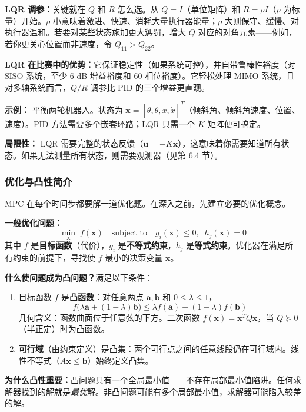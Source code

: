 \textbf{LQR 调参：}关键就在 $Q$ 和 $R$ 怎么选。从 $Q = I$（单位矩阵）和 $R = \rho I$（$\rho$ 为标量）开始。$\rho$ 小意味着激进、快速、消耗大量执行器能量；$\rho$ 大则保守、缓慢、对执行器温和。若要对某些状态施加更大惩罚，增大 $Q$ 对应的对角元素——例如，若你更关心位置而非速度，令 $Q_{11} > Q_{22}$。

\textbf{LQR 在比赛中的优势：}它保证稳定性（如果系统可控），并自带鲁棒性裕度（对 SISO 系统，至少 6 dB 增益裕度和 60\textdegree{} 相位裕度）。它轻松处理 MIMO 系统，且对多轴系统而言，$Q/R$ 调参比 PID 的三个增益更直观。

\textbf{示例：} 平衡两轮机器人。状态为 $\mathbf{x} = [\theta, \dot{\theta}, x, \dot{x}]^T$（倾斜角、倾斜角速度、位置、速度）。PID 方法需要多个嵌套环路；LQR 只需一个 $K$ 矩阵便可搞定。

\textbf{局限性：} LQR 需要完整的状态反馈（$\mathbf{u} = -K\mathbf{x}$），这意味着你需要知道所有状态。如果无法测量所有状态，则需要观测器（见第 6.4 节）。

\subsubsection{优化与凸性简介}

MPC 在每个时间步都要解一道优化题。在深入之前，先建立必要的优化概念。

\textbf{一般优化问题：}
\[
\min_{\mathbf{x}} \; f(\mathbf{x}) \quad \text{subject to} \quad g_i(\mathbf{x}) \leq 0, \;\; h_j(\mathbf{x}) = 0
\]
其中 $f$ 是\textbf{目标函数}（代价），$g_i$ 是\textbf{不等式约束}，$h_j$ 是\textbf{等式约束}。优化器在满足所有约束的前提下，寻找使 $f$ 最小的决策变量 $\mathbf{x}$。

\textbf{什么使问题成为凸问题？}满足以下条件：
\begin{enumerate}[nosep]
    \item 目标函数 $f$ 是\textbf{凸函数}：对任意两点 $\mathbf{a}, \mathbf{b}$ 和 $0 \leq \lambda \leq 1$，
    \[
    f\bigl(\lambda \mathbf{a} + (1-\lambda)\mathbf{b}\bigr) \leq \lambda f(\mathbf{a}) + (1-\lambda) f(\mathbf{b})
    \]
    几何含义：函数曲面位于任意弦的下方。二次函数 $f(\mathbf{x}) = \mathbf{x}^T Q \mathbf{x}$，当 $Q \succeq 0$（半正定）时为凸函数。
    \item \textbf{可行域}（由约束定义）是凸集：两个可行点之间的任意线段仍在可行域内。线性不等式（$A\mathbf{x} \leq \mathbf{b}$）始终定义凸集。
\end{enumerate}

\textbf{为什么凸性重要：}凸问题只有一个全局最小值——不存在局部最小值陷阱。任何求解器找到的解就是\textit{最优}解。非凸问题可能有多个局部最小值，求解器可能陷入较差的解。

